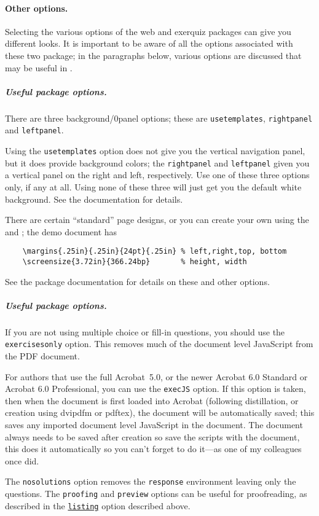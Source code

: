 \documentclass{article}
\begin{document}
\paragraph*{Other options.}
Selecting the various options of the \textsf{web} and
\textsf{exerquiz} packages can give you different looks.  It is
important to be aware of all the options associated with these
two package; in the paragraphs below, various options are
discussed that may be useful in .

\subparagraph*{Useful  package options.}
There are three background/\penalty0panel options; these are \texttt{usetemplates},
\texttt{rightpanel} and \texttt{leftpanel}.

Using the \texttt{usetemplates} option does not give you the vertical
navigation panel, but it does provide background colors; the
\texttt{rightpanel} and \texttt{leftpanel} given you a vertical panel on the
right and left, respectively.  Use one of these three options only, if any at
all. Using none of these three will just get you the default white
background. See the {\AEB} documentation for details.

There are certain ``standard'' page designs, or you can create your own using
the  and ; the demo document has
\begin{Verbatim}
    \margins{.25in}{.25in}{24pt}{.25in} % left,right,top, bottom
    \screensize{3.72in}{366.24bp}       % height, width
\end{Verbatim}
See the  package documentation for details on these and other
options.

\subparagraph*{Useful  package options.}
If you are not using  multiple choice or fill-in questions, you should use
the \texttt{exercisesonly} option. This removes much of the document level JavaScript
from the PDF document.

For authors that use the full Acrobat~5.0, or the newer Acrobat
6.0 Standard or Acrobat 6.0 Professional, you can use the
\texttt{execJS} option. If this option is taken, then when the
document is first loaded into Acrobat (following distillation, or
creation using \textsf{dvipdfm} or \textsf{pdftex}), the document
will be automatically saved; this saves any imported document
level JavaScript in the document. The document always needs to be saved
after creation so save the scripts with the document, this does it automatically
so you can't forget to do it---as one of my colleagues once did.

The \texttt{nosolutions} option removes the \texttt{response} environment
leaving only the questions. The \texttt{proofing} and \texttt{preview} options
can be useful for proofreading, as described in the \texttt{\hyperref[listing]{listing}}
option described above.
\end{document}

